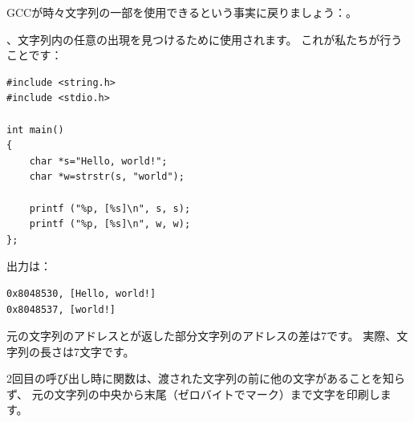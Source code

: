 \label{strstr_example}

GCCが時々文字列の一部を使用できるという事実に戻りましょう：。

 、文字列内の任意の出現を見つけるために使用されます。
これが私たちが行うことです：

\begin{lstlisting}[style=customc]
#include <string.h>
#include <stdio.h>

int main()
{
	char *s="Hello, world!";
	char *w=strstr(s, "world");

	printf ("%p, [%s]\n", s, s);
	printf ("%p, [%s]\n", w, w);
};
\end{lstlisting}

出力は：

\begin{lstlisting}
0x8048530, [Hello, world!]
0x8048537, [world!]
\end{lstlisting}

元の文字列のアドレスとが返した部分文字列のアドレスの差は7です。
実際、文字列の長さは7文字です。

2回目の呼び出し時に\printf{}関数は、渡された文字列の前に他の文字があることを知らず、
元の文字列の中央から末尾（ゼロバイトでマーク）まで文字を印刷します。